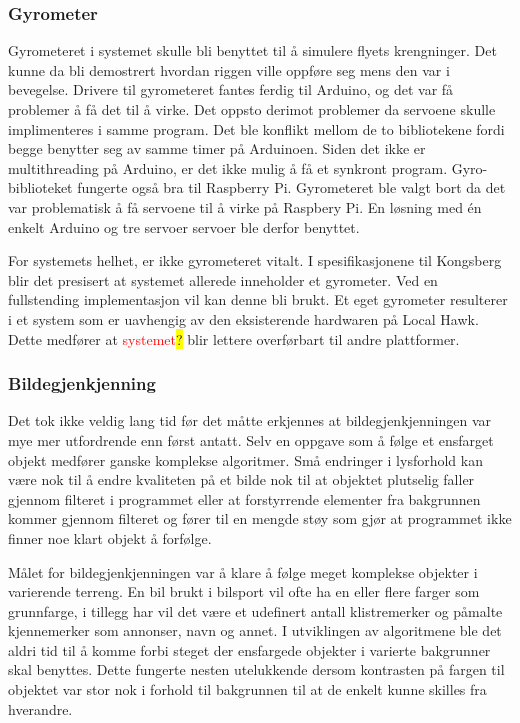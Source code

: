 \subsubsection{Gyrometer}
Gyrometeret i systemet skulle bli benyttet til å simulere flyets krengninger. Det kunne da bli demostrert hvordan riggen ville oppføre seg mens den var i bevegelse. Drivere til gyrometeret fantes ferdig til Arduino, og det var få problemer å få det til å virke. Det oppsto derimot problemer da servoene skulle implimenteres i samme program. Det ble konflikt mellom de to bibliotekene fordi begge benytter seg av samme timer på Arduinoen. Siden det ikke er multithreading på Arduino, er det ikke mulig å få et synkront program. Gyro-biblioteket fungerte også bra til Raspberry Pi. Gyrometeret ble valgt bort da det var problematisk å få servoene til å virke på Raspbery Pi. En løsning med én enkelt Arduino og tre servoer servoer ble derfor benyttet. 

For systemets helhet, er ikke gyrometeret vitalt. I spesifikasjonene til Kongsberg blir det presisert at systemet allerede inneholder et gyrometer. Ved en fullstending implementasjon vil kan denne bli brukt. Et eget gyrometer resulterer i et system som er uavhengig av den eksisterende hardwaren på Local Hawk. Dette medfører at \textcolor{red}{systemet}\colorbox{yellow}{?} blir lettere overførbart til andre plattformer.

\subsubsection{Bildegjenkjenning}

Det tok ikke veldig lang tid før det måtte erkjennes at bildegjenkjenningen var mye mer utfordrende enn først antatt. Selv en oppgave som å følge et ensfarget objekt medfører ganske komplekse algoritmer. Små endringer i lysforhold kan være nok til å endre kvaliteten på et bilde nok til at objektet plutselig faller gjennom filteret i programmet eller at forstyrrende elementer fra bakgrunnen kommer gjennom filteret og fører til en mengde støy som gjør at programmet ikke finner noe klart objekt å forfølge.

Målet for bildegjenkjenningen var å klare å følge meget komplekse objekter i varierende terreng. En bil brukt i bilsport vil ofte ha en eller flere farger som grunnfarge, i tillegg har vil det være et udefinert antall klistremerker og påmalte kjennemerker som annonser, navn og annet. I utviklingen av algoritmene ble det aldri tid til å komme forbi steget der ensfargede objekter i varierte bakgrunner skal benyttes. Dette fungerte nesten utelukkende dersom kontrasten på fargen til objektet var stor nok i forhold til bakgrunnen til at de enkelt kunne skilles fra hverandre.

